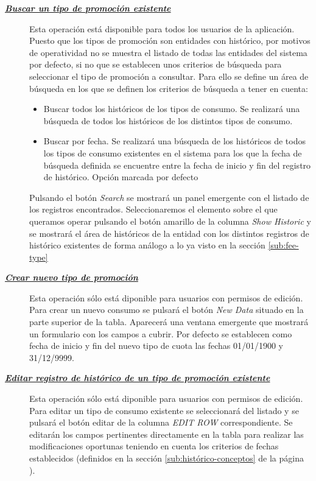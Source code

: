 \begin{description}
\item[\underline{\textsl{\textbf{Buscar un tipo de promoción existente}}}] Esta operación está disponible para todos los usuarios de la aplicación.
Puesto que los tipos de promoción son entidades con histórico, por motivos de operatividad no se muestra el listado de todas las entidades del sistema por defecto, si no que se establecen unos criterios de búsqueda para seleccionar el tipo de promoción a consultar. Para ello se define un área de búsqueda en los que se definen los criterios de búsqueda a tener en cuenta:
\begin{itemize}
\item Buscar todos los históricos de los tipos de consumo. Se realizará una búsqueda de todos los históricos de los distintos tipos de consumo.
\item Buscar por fecha. Se realizará una búsqueda de los históricos de todos los tipos de consumo existentes en el sistema para los que la fecha de búsqueda definida se encuentre entre la fecha de inicio y fin del registro de histórico. Opción marcada por defecto
\end{itemize}

Pulsando el botón \emph{Search} se mostrará un panel emergente con el listado de los registros encontrados. Seleccionaremos el elemento sobre el que queramos operar pulsando el botón amarillo de la columna \emph{Show Historic} y se mostrará el área de históricos de la entidad con los distintos registros de histórico existentes de forma análogo a lo ya visto en la sección \ref{sub:fee-type}

\item[\underline{\textsl{\textbf{Crear nuevo tipo de promoción}}}] Esta operación sólo está diponible para usuarios con permisos de edición.
Para crear un nuevo consumo se pulsará el botón \textit{New Data} situado en la parte superior de la tabla. Aparecerá una ventana emergente que mostrará un formulario con los campos a cubrir. Por defecto se establecen como fecha de inicio y fin del nuevo tipo de cuota las fechas 01/01/1900 y 31/12/9999.

\item[\underline{\textsl{\textbf{Editar registro de histórico de un tipo de promoción existente}}}] Esta operación sólo está diponible para usuarios con permisos de edición.
Para editar un tipo de consumo existente se seleccionará del listado y se pulsará el botón editar de la columna \textit{EDIT ROW} correspondiente. Se editarán los campos pertinentes directamente en la tabla para realizar las modificaciones oportunas teniendo en cuenta los criterios de fechas establecidos (definidos en la sección \ref{sub:histórico-conceptos} de la página \pageref{sub:histórico-conceptos}).


\end{description}
